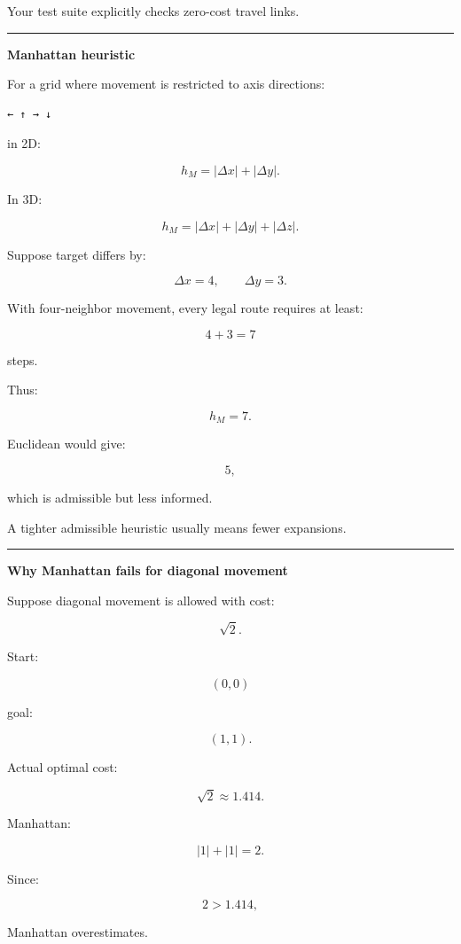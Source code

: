 Your test suite explicitly checks zero-cost travel links.

\begin{center}\rule{0.5\linewidth}{0.5pt}\end{center}

\textbf{Manhattan heuristic}

For a grid where movement is restricted to axis directions:

\begin{verbatim}
← ↑ → ↓
\end{verbatim}

in 2D:

\[
\boxed{
h_M=
|\Delta x|+|\Delta y|.
}
\]

In 3D:

\[
h_M=
|\Delta x|+
|\Delta y|+
|\Delta z|.
\]

Suppose target differs by:

\[
\Delta x=4,
\qquad
\Delta y=3.
\]

With four-neighbor movement, every legal route requires at least:

\[
4+3=7
\]

steps.

Thus:

\[
h_M=7.
\]

Euclidean would give:

\[
5,
\]

which is admissible but less informed.

A tighter admissible heuristic usually means fewer expansions.

\begin{center}\rule{0.5\linewidth}{0.5pt}\end{center}

\textbf{Why Manhattan fails for diagonal movement}

Suppose diagonal movement is allowed with cost:

\[
\sqrt2.
\]

Start:

\[
(0,0)
\]

goal:

\[
(1,1).
\]

Actual optimal cost:

\[
\sqrt2\approx1.414.
\]

Manhattan:

\[
|1|+|1|=2.
\]

Since:

\[
2>1.414,
\]

Manhattan overestimates.

